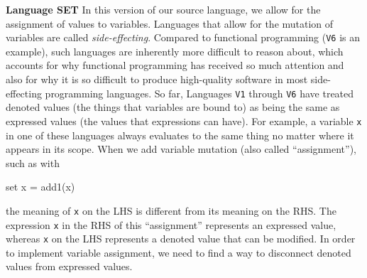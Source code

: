 \begin{minipage}[t]{\sw}
\slidenumber
\LARGE
{\bf Language SET}\exx
In this version of our source language,
we allow for the assignment of values to variables.
Languages that allow for the mutation of variables
are called {\em side-effecting}.
Compared to functional programming (\verb'V6' is an example),
such languages
are inherently more difficult to reason about,
which accounts for why functional programming has received
so much attention and also for why
it is so difficult to produce high-quality software
in most side-effecting programming languages.\exx
So far, Languages \verb'V1' through \verb'V6' have treated
denoted values (the things that variables are bound to)
as being the same as expressed values
(the values that expressions can have).
For example, a variable \verb'x' in one of these languages
always evaluates to the same thing no matter where it appears
in its scope.\exx
When we add variable mutation (also called ``assignment''),
such as with
\begin{qv}
set x = add1(x)
\end{qv}
the meaning of \verb'x' on the LHS is different
from its meaning on the RHS.
The expression \verb'x' in the RHS of this ``assignment''
represents an expressed value,
whereas \verb'x' on the LHS
represents a denoted value that can be modified.
In order to implement variable assignment,
we need to find a way
to disconnect denoted values from expressed values.
\end{minipage}
\clearpage
